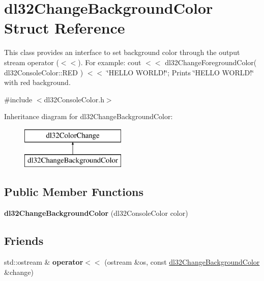 \hypertarget{structdl32_change_background_color}{\section{dl32\-Change\-Background\-Color Struct Reference}
\label{structdl32_change_background_color}
}


This class provides an interface to set background color through the output stream operator ($<$$<$). For example\-: cout $<$$<$ dl32\-Change\-Foreground\-Color( dl32\-Console\-Color\-::\-R\-E\-D ) $<$$<$ \char`\"{}\-H\-E\-L\-L\-O W\-O\-R\-L\-D!\char`\"{}; Prints \char`\"{}\-H\-E\-L\-L\-O W\-O\-R\-L\-D!\char`\"{} with red background.  




{\ttfamily \#include $<$dl32\-Console\-Color.\-h$>$}

Inheritance diagram for dl32\-Change\-Background\-Color\-:\begin{figure}[H]
\begin{center}
\leavevmode
\includegraphics[height=2.000000cm]{structdl32_change_background_color}
\end{center}
\end{figure}
\subsection*{Public Member Functions}
\begin{DoxyCompactItemize}
\item 
\hypertarget{structdl32_change_background_color_a30fd13cff620aa86fcdc1e2f2a4db4d9}{{\bfseries dl32\-Change\-Background\-Color} (dl32\-Console\-Color color)}\label{structdl32_change_background_color_a30fd13cff620aa86fcdc1e2f2a4db4d9}

\end{DoxyCompactItemize}
\subsection*{Friends}
\begin{DoxyCompactItemize}
\item 
\hypertarget{structdl32_change_background_color_abc9aeec3e8422893a115de08f5280b16}{std\-::ostream \& {\bfseries operator$<$$<$} (ostream \&os, const \hyperlink{structdl32_change_background_color}{dl32\-Change\-Background\-Color} \&change)}\label{structdl32_change_background_color_abc9aeec3e8422893a115de08f5280b16}

\end{DoxyCompactItemize}

